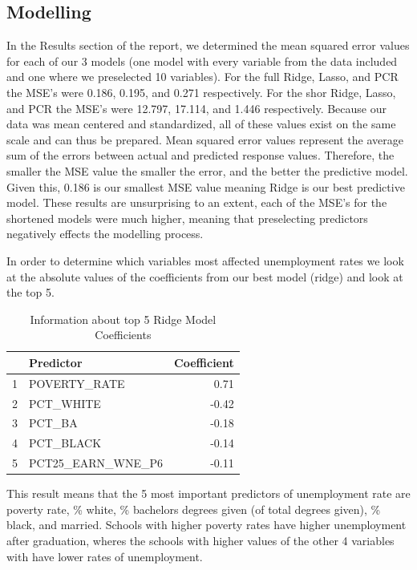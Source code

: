 \documentclass{article}\usepackage[]{graphicx}\usepackage[]{color}
\begin{document}
\subsection{Modelling}
In the Results section of the report, we determined the mean squared error values for each of our 3 models (one model with every variable from the data included and one where we preselected 10 variables).  For the full Ridge, Lasso, and PCR the MSE's were 0.186, 0.195, and 0.271 respectively. For the shor Ridge, Lasso, and PCR the MSE's were 12.797, 17.114, and 1.446 respectively. Because our data was mean centered and standardized, all of these values exist on the same scale and can thus be prepared.  Mean squared error values represent the average sum of the errors between actual and predicted response values. Therefore, the smaller the MSE value the smaller the error, and the better the predictive model.  Given this, 0.186 is our smallest MSE value meaning Ridge is our best predictive model. These results are unsurprising to an extent, each of the MSE's for the shortened models were much higher, meaning that preselecting predictors negatively effects the modelling process.  

In order to determine which variables most affected unemployment rates we look at the absolute values of the coefficients from our best model (ridge) and look at the top 5. 


\begin{table}[ht]
\centering
\begin{tabular}{rlr}
  \hline
 & Predictor & Coefficient \\ 
  \hline
1 & POVERTY\_RATE & 0.71 \\ 
  2 & PCT\_WHITE & -0.42 \\ 
  3 & PCT\_BA & -0.18 \\ 
  4 & PCT\_BLACK & -0.14 \\ 
  5 & PCT25\_EARN\_WNE\_P6 & -0.11 \\ 
   \hline
\end{tabular}
\caption{Information about top 5  Ridge Model Coefficients} 
\end{table}


This result means that the 5 most important predictors of unemployment rate are poverty rate, \% white, \% bachelors degrees given (of total degrees given), \% black, and married.  Schools with higher poverty rates have higher unemployment after graduation, wheres the schools with higher values of the other 4 variables with have lower rates of unemployment.
\end{document}
